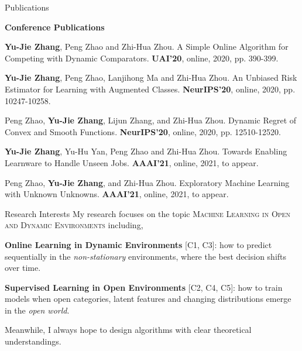 \documentclass{resume} %
\begin{document}
\begin{rSection}{Publications}

\noindent \textbf{Conference Publications}
\begin{enumerate}[{label = [C{\arabic*}]}]
	\item \textbf{Yu-Jie Zhang}, Peng Zhao and Zhi-Hua Zhou. A Simple Online Algorithm for Competing with Dynamic Comparators. \textbf{UAI'20}, online, 2020, pp. 390-399.
	\item \textbf{Yu-Jie Zhang}, Peng Zhao, Lanjihong Ma and Zhi-Hua Zhou. {An Unbiased Risk Estimator for Learning with Augmented Classes.} \textbf{NeurIPS'20}, online, 2020, pp. 10247-10258.
	\item Peng Zhao, \textbf{Yu-Jie Zhang}, Lijun Zhang, and Zhi-Hua Zhou. {Dynamic Regret of Convex and Smooth Functions.} \textbf{NeurIPS'20}, online, 2020, pp. 12510-12520.
	\item \textbf{Yu-Jie Zhang}, Yu-Hu Yan, Peng Zhao and Zhi-Hua Zhou. {Towards Enabling Learnware to Handle Unseen Jobs.} \textbf{AAAI'21}, online, 2021, to appear.	
	\item Peng Zhao, \textbf{Yu-Jie Zhang}, and Zhi-Hua Zhou. {Exploratory Machine Learning with Unknown Unknowns.} \textbf{AAAI'21}, online, 2021, to appear.	
\end{enumerate}
\end{rSection}

\begin{rSection}{Research Interests}
My research focuses on the topic \small{\textsc{Machine Learning in Open and Dynamic Environments}} including,
\begin{enumerate}[{label = [\arabic*]}]
	\item \textbf{Online Learning in Dynamic Environments} [C1, C3]: how to predict sequentially in the \emph{non-stationary} environments, where the best decision shifts over time.
	\item \textbf{Supervised Learning in Open Environments} [C2, C4, C5]: how to train models when open categories, latent features and changing distributions emerge in the \emph{open world}.
\end{enumerate}
Meanwhile, I always hope to design algorithms with clear theoretical understandings.
\end{rSection}
\end{document}
